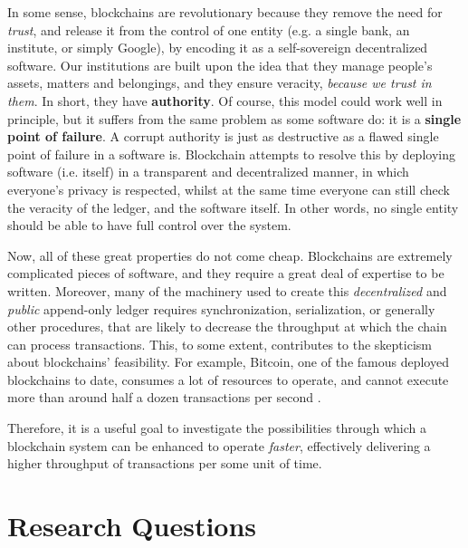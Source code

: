 In some sense, blockchains are revolutionary because they remove the need for \textit{trust}, and
release it from the control of one entity (e.g. a single bank, an institute, or simply Google), by
encoding it as a self-sovereign decentralized software. Our institutions are built upon the idea
that they manage people's assets, matters and belongings, and they ensure veracity, \textit{because
we trust in them}. In short, they have \textbf{authority}. Of course, this model could work well in
principle, but it suffers from the same problem as some software do: it is a \textbf{single point of
failure}. A corrupt authority is just as destructive as a flawed single point of failure in a
software is. Blockchain attempts to resolve this by deploying software (i.e. itself) in a
transparent and decentralized manner, in which everyone's privacy is respected, whilst at the same
time everyone can still check the veracity of the ledger, and the software itself. In other words,
no single entity should be able to have full control over the system.

Now, all of these great properties do not come cheap. Blockchains are extremely complicated pieces
of software, and they require a great deal of expertise to be written. Moreover, many of the
machinery used to create this \textit{decentralized} and \textit{public} append-only ledger requires
synchronization, serialization, or generally other procedures, that are likely to decrease the
throughput at which the chain can process transactions. This, to some extent, contributes to the
skepticism about blockchains' feasibility. For example, Bitcoin, one of the famous deployed
blockchains to date, consumes a lot of resources to operate, and cannot execute more than around
half a dozen transactions per second \cite{gervaisSecurityPerformanceProof2016}.

Therefore, it is a useful goal to investigate the possibilities through which a blockchain system
can be enhanced to operate \textit{faster}, effectively delivering a higher throughput of
transactions per some unit of time.

\section{Research Questions} \label{chap_intro:sec:resarch_q}

